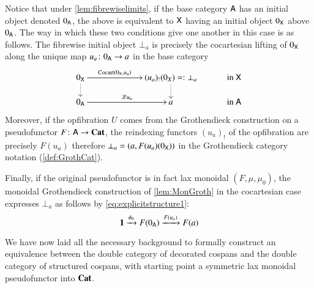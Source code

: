 \documentclass[reqno]{amsart}
\begin{document}
\begin{rmk}\label{rmk:important}
Notice that under \cref{lem:fibrewiselimits}, if the base category $\mathsf{A}$ has an initial object denoted $0_{\mathsf{A}}$, the above is equivalent to $\mathsf{X}$ having an initial object $0_{\mathsf{X}}$ above $0_{\mathsf{A}}$. The way in which these two conditions give one another in this case is as follows. 
The fibrewise initial object $\bot_a$ is precisely the cocartesian lifting of $0_{\mathsf{X}}$ along the unique map $u_a\colon0_{\mathsf{A}}\to a$ in the base category
\begin{displaymath}
\xymatrix @C=.4in @R=.2in
{0_\X \ar @{.>}[d]\ar[rr]^-{\mathrm{Cocart}(0_\X,u_a)} && (u_a)_!(0_X)=:\bot_a\ar @{.>}[d] & \textrm{in }\X  \\
0_\A\ar[rr]^-{\exists!u_a} && a & \textrm{in }\A}
\end{displaymath}
Moreover, if the opfibration $U$ comes from the Grothendieck construction on a pseudofunctor $F\colon\mathsf{A}\to\mathbf{Cat}$, the reindexing functors $(u_a)_!$ of the opfibration are precisely $F(u_a)$ therefore $\bot_a=(a,F(u_a)(0_{\mathsf{X}}))$ in the Grothendieck category notation (\cref{def:GrothCat}).

Finally, if the original pseudofunctor is in fact lax monoidal $(F,\mu,\mu_0)$, the monoidal Grothendieck construction of \cref{lem:MonGroth} in the cocartesian case expresses $\bot_a$ as follows by \cref{eq:explicitstructure1}:
\begin{equation}\label{eq:initialinfibre}
\mathbf{1}\xrightarrow{\phi_0}F(0_{\mathsf{A}})\xrightarrow{F(u_a)}F(a) 
\end{equation}
\end{rmk}

We have now laid all the necessary background to formally construct an equivalence between the double category of decorated cospans and the double category of structured cospans, with starting point a symmetric lax monoidal pseudofunctor into $\mathbf{Cat}$.
\end{document}
